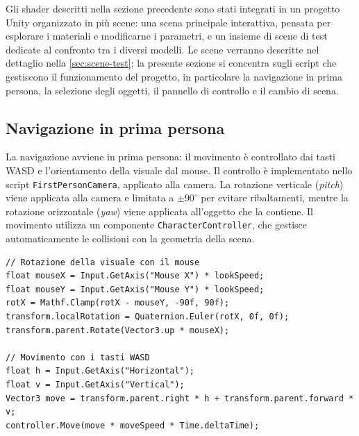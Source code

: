 \documentclass[12pt,a4paper,twoside]{book}
\begin{document}
Gli shader descritti nella sezione precedente sono stati integrati in un progetto Unity organizzato in più scene: una scena principale interattiva, pensata per esplorare i materiali e modificarne i parametri, e un insieme di scene di test dedicate al confronto tra i diversi modelli. Le scene verranno descritte nel dettaglio nella \cref{sec:scene-test}; la presente sezione si concentra sugli script che gestiscono il funzionamento del progetto, in particolare la navigazione in prima persona, la selezione degli oggetti, il pannello di controllo e il cambio di scena.

\begin{minipage}{\textwidth}

\subsection{Navigazione in prima persona}
\label{subsec:navigazione}

La navigazione avviene in prima persona: il movimento è controllato dai tasti WASD e l'orientamento della visuale dal mouse. Il controllo è implementato nello script \texttt{FirstPersonCamera}, applicato alla camera. La rotazione verticale (\textit{pitch}) viene applicata alla camera e limitata a $\pm 90^\circ$ per evitare ribaltamenti, mentre la rotazione orizzontale (\textit{yaw}) viene applicata all'oggetto che la contiene. Il movimento utilizza un componente \texttt{CharacterController}, che gestisce automaticamente le collisioni con la geometria della scena.

\begin{lstlisting}[style=hlsl,
    caption={Logica di movimento e rotazione della camera.},
    label={lst:camera}]
// Rotazione della visuale con il mouse
float mouseX = Input.GetAxis("Mouse X") * lookSpeed;
float mouseY = Input.GetAxis("Mouse Y") * lookSpeed;
rotX = Mathf.Clamp(rotX - mouseY, -90f, 90f);
transform.localRotation = Quaternion.Euler(rotX, 0f, 0f);
transform.parent.Rotate(Vector3.up * mouseX);

// Movimento con i tasti WASD
float h = Input.GetAxis("Horizontal");
float v = Input.GetAxis("Vertical");
Vector3 move = transform.parent.right * h + transform.parent.forward * v;
controller.Move(move * moveSpeed * Time.deltaTime);
\end{lstlisting}
\end{minipage}
\end{document}
